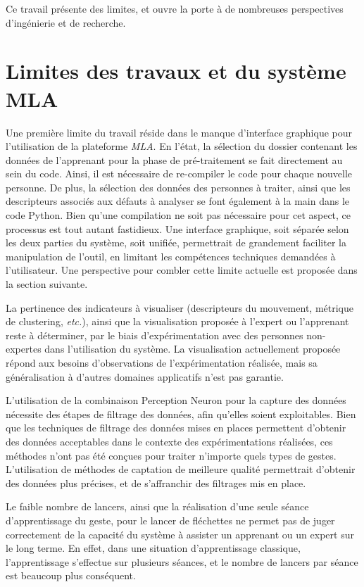 Ce travail présente des limites, et ouvre la porte à de nombreuses perspectives d'ingénierie et de recherche.


\section{Limites des travaux et du système MLA}
Une première limite du travail réside dans le manque d'interface graphique pour l'utilisation de la plateforme \textit{MLA}. En l'état, la sélection du dossier contenant les données de l'apprenant pour la phase de pré-traitement se fait directement au sein du code. Ainsi, il est nécessaire de re-compiler le code pour chaque nouvelle personne. De plus, la sélection des données des personnes à traiter, ainsi que les descripteurs associés aux défauts à analyser se font également à la main dans le code Python. Bien qu'une compilation ne soit pas nécessaire pour cet aspect, ce processus est tout autant fastidieux. Une interface graphique, soit séparée selon les deux parties du système, soit unifiée, permettrait de grandement faciliter la manipulation de l'outil, en limitant les compétences techniques demandées à l'utilisateur. Une perspective pour combler cette limite actuelle est proposée dans la section suivante.

La pertinence des indicateurs à visualiser (descripteurs du mouvement, métrique de clustering, \textit{etc.}), ainsi que la visualisation proposée à l'expert ou l'apprenant reste à déterminer, par le biais d'expérimentation avec des personnes non-expertes dans l'utilisation du système. La visualisation actuellement proposée répond aux besoins d'observations de l'expérimentation réalisée, mais sa généralisation à d'autres domaines applicatifs n'est pas garantie.

L'utilisation de la combinaison Perception Neuron pour la capture des données nécessite des étapes de filtrage des données, afin qu'elles soient exploitables. Bien que les techniques de filtrage des données mises en places permettent d'obtenir des données acceptables dans le contexte des expérimentations réalisées, ces méthodes n'ont pas été conçues pour traiter n'importe quels types de gestes. L'utilisation de méthodes de captation de meilleure qualité permettrait d'obtenir des données plus précises, et de s'affranchir des filtrages mis en place.

Le faible nombre de lancers, ainsi que la réalisation d'une seule séance d'apprentissage du geste, pour le lancer de fléchettes ne permet pas de juger correctement de la capacité du système à assister un apprenant ou un expert sur le long terme. En effet, dans une situation d'apprentissage classique, l'apprentissage s'effectue sur plusieurs séances, et le nombre de lancers par séance est beaucoup plus conséquent.

